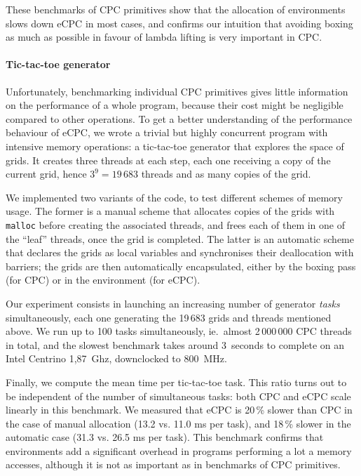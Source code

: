 \documentclass[a4paper]{llncs}
\begin{document}
These benchmarks of CPC primitives show that the allocation of environments
slows down eCPC in most cases, and confirms our intuition that avoiding boxing
as much as possible in favour of lambda lifting is very important in CPC.


\paragraph{Tic-tac-toe generator}

Unfortunately, benchmarking individual CPC primitives gives little information
on the performance of a whole program, because their cost might be negligible
compared to other operations.   To get a better understanding of the performance
behaviour of eCPC, we wrote a trivial but highly concurrent program with
intensive memory operations: a tic-tac-toe generator that explores the space of
grids.  It creates three threads at each step, each one receiving a copy of the
current grid, hence $3^9 = 19\,683$ threads and as many copies of the grid.

We implemented two variants of the code, to test different schemes of memory
usage.  The former is a manual scheme that allocates copies of the grids with
\texttt{malloc} before creating the associated threads, and frees each of them
in one of the ``leaf'' threads, once the grid is completed.  The latter is an
automatic scheme that declares the grids as local variables and synchronises
their deallocation with barriers;  the grids are then automatically
encapsulated, either by the boxing pass (for CPC) or in the environment (for
eCPC).

Our experiment consists in launching an increasing number of generator
\emph{tasks} simultaneously, each one generating the 19\,683 grids and threads
mentioned above.  We run up to 100 tasks simultaneously, ie.\ almost 2\,000\,000
CPC threads in total, and the slowest benchmark takes around 3~seconds to
complete on an Intel Centrino 1,87~Ghz, downclocked to 800~MHz.

Finally, we compute the mean time per tic-tac-toe task. This ratio turns out
to be independent of the number of simultaneous tasks: both CPC and eCPC scale linearly
in this benchmark.  We measured that eCPC is 20\,\% slower than CPC in the case
of manual allocation (13.2 vs. 11.0 ms per task), and 18\,\% slower in the
automatic case (31.3 vs. 26.5 ms per task).  This benchmark confirms that
environments add a significant overhead in programs performing a lot a memory
accesses, although it is not as important as in benchmarks of CPC primitives.
\end{document}

